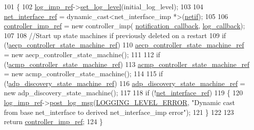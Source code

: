 \begin{DoxyCode}
101 \{
102     \hyperlink{namespaceavdecc__lib_acbe3e2a96ae6524943ca532c87a28529}{log\_imp\_ref}->\hyperlink{classavdecc__lib_1_1log_ad2416d14295c0883c8b0f13cf36fe1db}{set\_log\_level}(initial\_log\_level);
103 
104     \hyperlink{namespaceavdecc__lib_adb4da03bc65b7846cc240ee919bbde19}{net\_interface\_ref} = \textcolor{keyword}{dynamic\_cast<}net\_interface\_imp *\textcolor{keyword}{>}(\hyperlink{structnetif}{netif});
105 
106     \hyperlink{namespaceavdecc__lib_ac8771a60b14cca3f0e41704835ac30ec}{controller\_imp\_ref} = \textcolor{keyword}{new} controller\_imp(
      \hyperlink{cmd__line__main_8cpp_a5e19a4f077d77019fc6474b479a6ea35}{notification\_callback}, \hyperlink{cmd__line__main_8cpp_ad5ddf1bf7126d36551ebbbeebeb304a2}{log\_callback});
107 
108     \textcolor{comment}{//Start up state machines if previously deleted on a restart}
109     \textcolor{keywordflow}{if} (!\hyperlink{namespaceavdecc__lib_a0b1b5aea3c0490f77cbfd9178af5be22}{aecp\_controller\_state\_machine\_ref})
110         \hyperlink{namespaceavdecc__lib_a0b1b5aea3c0490f77cbfd9178af5be22}{aecp\_controller\_state\_machine\_ref} = \textcolor{keyword}{new} 
      aecp\_controller\_state\_machine();
111 
112     \textcolor{keywordflow}{if} (!\hyperlink{namespaceavdecc__lib_a693c2049de1d4ec860a92126b846ac21}{acmp\_controller\_state\_machine\_ref})
113         \hyperlink{namespaceavdecc__lib_a693c2049de1d4ec860a92126b846ac21}{acmp\_controller\_state\_machine\_ref} = \textcolor{keyword}{new} 
      acmp\_controller\_state\_machine();
114 
115     \textcolor{keywordflow}{if} (!\hyperlink{namespaceavdecc__lib_aa33697f1203280924134bb7fdcc76129}{adp\_discovery\_state\_machine\_ref})
116         \hyperlink{namespaceavdecc__lib_aa33697f1203280924134bb7fdcc76129}{adp\_discovery\_state\_machine\_ref} = \textcolor{keyword}{new} adp\_discovery\_state\_machine();
117 
118     \textcolor{keywordflow}{if} (!\hyperlink{namespaceavdecc__lib_adb4da03bc65b7846cc240ee919bbde19}{net\_interface\_ref})
119     \{
120         \hyperlink{namespaceavdecc__lib_acbe3e2a96ae6524943ca532c87a28529}{log\_imp\_ref}->\hyperlink{classavdecc__lib_1_1log_a68139a6297697e4ccebf36ccfd02e44a}{post\_log\_msg}(\hyperlink{namespaceavdecc__lib_a501055c431e6872ef46f252ad13f85cdaf2c4481208273451a6f5c7bb9770ec8a}{LOGGING\_LEVEL\_ERROR}, \textcolor{stringliteral}{"Dynamic
       cast from base net\_interface to derived net\_interface\_imp error"});
121     \}
122 
123     \textcolor{keywordflow}{return} \hyperlink{namespaceavdecc__lib_ac8771a60b14cca3f0e41704835ac30ec}{controller\_imp\_ref};
124 \}
\end{DoxyCode}


